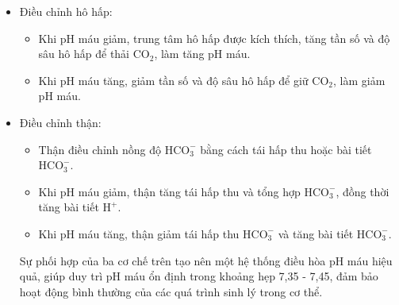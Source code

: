 \documentclass[Main.tex]{subfiles}
\begin{document}
\begin{bt}
{\begin{enumerate}
\begin{itemize}
\begin{itemize}
				\item Khi có axit được thêm vào máu: $\mathrm{H}^+ + \mathrm{HCO}_3^- \rightarrow \mathrm{H}_2\mathrm{CO}_3 \rightarrow \mathrm{CO}_2 + \mathrm{H}_2\mathrm{O}$
				\item Khi có bazơ được thêm vào máu: $\mathrm{OH}^- + \mathrm{H}_2\mathrm{CO}_3 \rightarrow \mathrm{HCO}_3^- + \mathrm{H}_2\mathrm{O}$
			\end{itemize}
				\item Điều chỉnh hô hấp:
				\begin{itemize}
					\item Khi pH máu giảm, trung tâm hô hấp được kích thích, tăng tần số và độ sâu hô hấp để thải $\mathrm{CO}_2$, làm tăng pH máu.
					\item Khi pH máu tăng, giảm tần số và độ sâu hô hấp để giữ $\mathrm{CO}_2$, làm giảm pH máu.
				\end{itemize}
				
				\item Điều chỉnh thận:
			\begin{itemize}
				\item Thận điều chỉnh nồng độ $\mathrm{HCO}_3^-$ bằng cách tái hấp thu hoặc bài tiết $\mathrm{HCO}_3^-$.
				\item Khi pH máu giảm, thận tăng tái hấp thu và tổng hợp $\mathrm{HCO}_3^-$, đồng thời tăng bài tiết $\mathrm{H}^+$.
				\item Khi pH máu tăng, thận giảm tái hấp thu $\mathrm{HCO}_3^-$ và tăng bài tiết $\mathrm{HCO}_3^-$.
			\end{itemize}
				Sự phối hợp của ba cơ chế trên tạo nên một hệ thống điều hòa pH máu hiệu quả, giúp duy trì pH máu ổn định trong khoảng hẹp 7,35 - 7,45, đảm bảo hoạt động bình thường của các quá trình sinh lý trong cơ thể.
		\end{itemize}
\end{enumerate}
	}
\end{bt}
\end{document}
